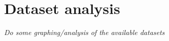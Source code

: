 
\section{Dataset analysis}\label{sec:results:data}

\textit{Do some graphing/analysis of the available datasets}
